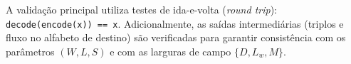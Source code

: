 A validação principal utiliza testes de ida-e-volta (\textit{round trip}):
\texttt{decode(encode(x)) == x}. Adicionalmente, as saídas intermediárias
(triplos e fluxo no alfabeto de destino) são verificadas para garantir
consistência com os parâmetros $(W, L, S)$ e com as larguras de campo $\{D,
    L_w, M\}$.

